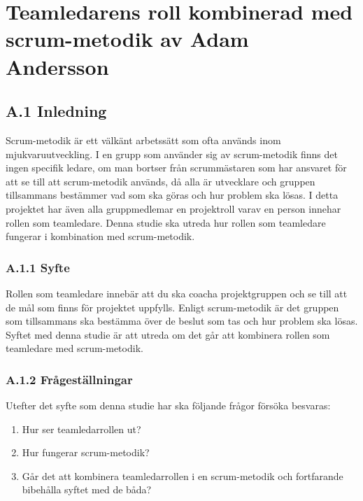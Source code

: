\chapter{Teamledarens roll kombinerad med scrum-metodik av Adam Andersson}

\section{A.1 Inledning}
Scrum-metodik är ett välkänt arbetssätt som ofta används inom mjukvaruutveckling. I en grupp som använder sig av scrum-metodik finns det ingen specifik ledare, om man bortser från scrummästaren som har ansvaret för att se till att scrum-metodik används, då alla är utvecklare och gruppen tillsammans bestämmer vad som ska göras och hur problem ska lösas.
I detta projektet har även alla gruppmedlemar en projektroll varav en person innehar rollen som teamledare. Denna studie ska utreda hur rollen som teamledare fungerar i kombination med scrum-metodik.

\subsection{A.1.1 Syfte}
Rollen som teamledare innebär att du ska coacha projektgruppen och se till att de mål som finns för projektet uppfylls. Enligt scrum-metodik är det gruppen som tillsammans ska bestämma över de beslut som tas och hur problem ska lösas. Syftet med denna studie är att utreda om det går att kombinera rollen som teamledare med scrum-metodik.

\subsection{A.1.2 Frågeställningar}
Utefter det syfte som denna studie har ska följande frågor försöka besvaras:

\begin{enumerate}
	\item Hur ser teamledarrollen ut?
	\item Hur fungerar scrum-metodik?
	\item Går det att kombinera teamledarrollen i en scrum-metodik och fortfarande bibehålla syftet med de båda? 
\end{enumerate}

